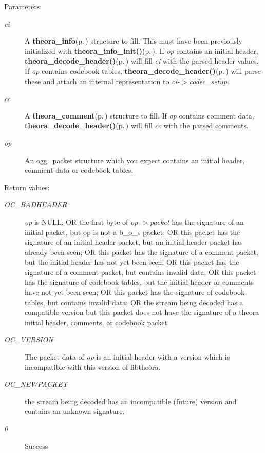 \begin{Desc}
\item[Parameters:]
\begin{description}
\item[{\em ci}]A {\bf theora\_\-info}{\rm (p.\,\pageref{structtheora__info})} structure to fill. This must have been previously initialized with {\bf theora\_\-info\_\-init()}{\rm (p.\,\pageref{theora_8h_f0f9fbb7e7bcce3c536e0b46d300c71e})}. If {\em op\/} contains an initial header, {\bf theora\_\-decode\_\-header()}{\rm (p.\,\pageref{theora_8h_41a60c67649c41ae88278d777f89ee3f})} will fill {\em ci\/} with the parsed header values. If {\em op\/} contains codebook tables, {\bf theora\_\-decode\_\-header()}{\rm (p.\,\pageref{theora_8h_41a60c67649c41ae88278d777f89ee3f})} will parse these and attach an internal representation to {\em ci-$>$codec\_\-setup\/}. \item[{\em cc}]A {\bf theora\_\-comment}{\rm (p.\,\pageref{structtheora__comment})} structure to fill. If {\em op\/} contains comment data, {\bf theora\_\-decode\_\-header()}{\rm (p.\,\pageref{theora_8h_41a60c67649c41ae88278d777f89ee3f})} will fill {\em cc\/} with the parsed comments. \item[{\em op}]An ogg\_\-packet structure which you expect contains an initial header, comment data or codebook tables.\end{description}
\end{Desc}
\begin{Desc}
\item[Return values:]
\begin{description}
\item[{\em OC\_\-BADHEADER}]{\em op\/} is NULL; OR the first byte of {\em op-$>$packet\/} has the signature of an initial packet, but op is not a b\_\-o\_\-s packet; OR this packet has the signature of an initial header packet, but an initial header packet has already been seen; OR this packet has the signature of a comment packet, but the initial header has not yet been seen; OR this packet has the signature of a comment packet, but contains invalid data; OR this packet has the signature of codebook tables, but the initial header or comments have not yet been seen; OR this packet has the signature of codebook tables, but contains invalid data; OR the stream being decoded has a compatible version but this packet does not have the signature of a theora initial header, comments, or codebook packet \item[{\em OC\_\-VERSION}]The packet data of {\em op\/} is an initial header with a version which is incompatible with this version of libtheora. \item[{\em OC\_\-NEWPACKET}]the stream being decoded has an incompatible (future) version and contains an unknown signature. \item[{\em 0}]Success\end{description}
\end{Desc}
